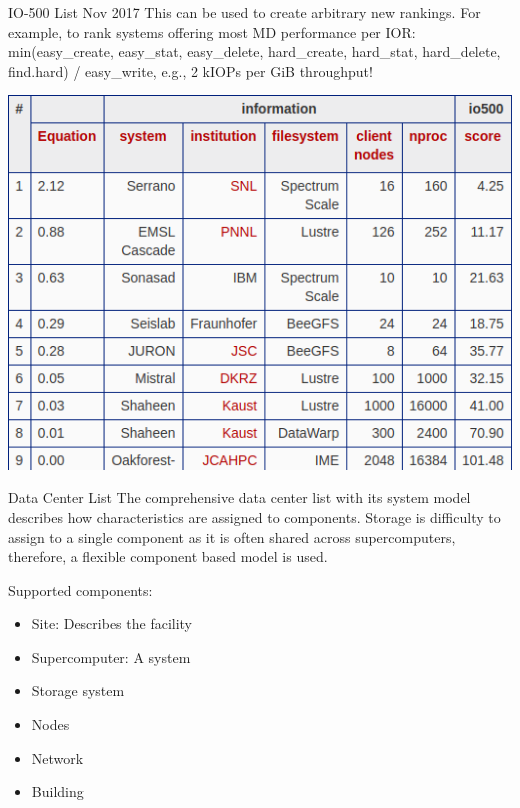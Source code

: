 \documentclass[portrait,a0paper,fontscale=0.4]{baposter}
\newcommand{\compresslist}{%
\setlength{\itemsep}{1pt}%
\setlength{\parskip}{0pt}%
\setlength{\parsep}{0pt}%
}
\begin{document}
\begin{poster}
\begin{posterbox}[name=io500res,column=1,above=bottom,below=io500]{IO-500 List Nov 2017}
This can be used to create arbitrary new rankings.
For example, to rank systems offering most MD performance per IOR:
{\scriptsize min(easy\_create, easy\_stat, easy\_delete, hard\_create, hard\_stat, hard\_delete, find.hard) / easy\_write}, e.g., 2 kIOPs per GiB throughput!

\includegraphics[width=\textwidth]{io500-md}

\end{posterbox}



\begin{posterbox}[name=schedule,column=2,span=1, above=bottom, below=io500]{Data Center List}
The comprehensive data center list with its system model describes how characteristics are assigned to components.
Storage is difficulty to assign to a single component as it is often shared across supercomputers,
therefore, a flexible component based model is used.

Supported components:
\vspace*{-1em}
\begin{itemize}\compresslist
\item Site: Describes the facility
\item Supercomputer: A system
\item Storage system
\item Nodes
\item Network
\item Building
\end{itemize}

\vspace*{-1em}


\end{posterbox}
\end{poster}
\end{document}
